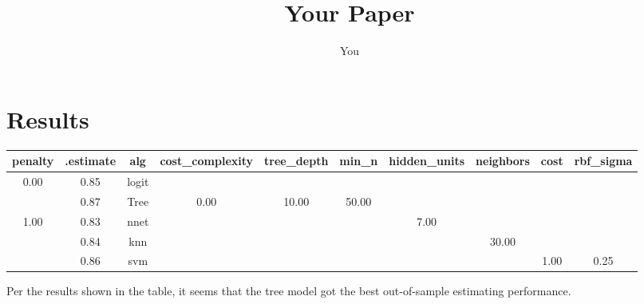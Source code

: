 \documentclass{article}
\title{Your Paper}
\author{You}
\begin{document}
\maketitle



\section{Results}

\begin{center}
\begin{tabular}{|c|c|c|c|c|c|c|c|c|c|} 

 penalty & .estimate & alg  & cost_complexity & tree_depth  & min_n & hidden_units &neighbors &cost & rbf_sigma   \\ [0.5ex] 
 \hline
 0.00 &0.85 &logit & & & & & & & \\ 

 & 0.87 &Tree & 0.00  & 10.00 & 50.00 & & & &\\
 
 1.00 & 0.83 & nnet & & & & 7.00 & & &       \\
 
 & 0.84 & knn & & & & & 30.00 & & \\
 
 & 0.86 & svm & & & & & & 1.00 & 0.25  \\ [1ex] 

\end{tabular}
\end{center}

Per the results shown in the table, it seems that the tree model got the best out-of-sample estimating performance.
\end{document}
